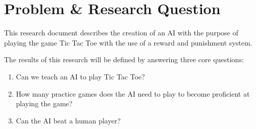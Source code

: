 \section{Problem \& Research Question}

This research document describes the creation of an \ac{AI} with the purpose of playing the game Tic Tac Toe with the use of a reward and punishment system.

The results of this research will be defined by answering three core questions:

\begin{enumerate}
	\item Can we teach an \ac{AI} to play Tic Tac Toe?
	\item How many practice games does the \ac{AI} need to play to become proficient at playing the game?
	\item Can the \ac{AI} beat a human player?
\end{enumerate}

